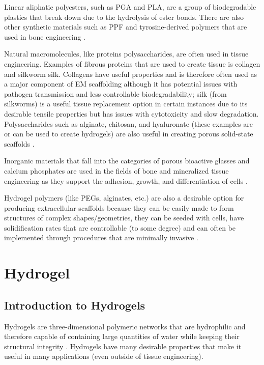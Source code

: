 Linear aliphatic polyesters, such as PGA and PLA, are a group of biodegradable plastics that break down due to the hydrolysis of ester bonds. There are also other synthetic materials such as PPF and tyrosine-derived polymers that are used in bone engineering \citep{mapx2004}.

Natural macromolecules, like proteins polysaccharides, are often used in tissue engineering. Examples of fibrous proteins that are used to create tissue is collagen and silkworm silk. Collagens have useful properties and is therefore often used as a major component of EM scaffolding although it has potential issues with pathogen transmission and less controllable biodegradability; silk (from silkworms) is a useful tissue replacement option in certain instances due to its desirable tensile properties but has issues with cytotoxicity and slow degradation. Polysaccharides such as alginate, chitosan, and hyaluronate (these examples are or can be used to create hydrogels) are also useful in creating porous solid-state scaffolds \citep{mapx2004}.

Inorganic materials that fall into the categories of porous bioactive glasses and calcium phosphates are used in the fields of bone and mineralized tissue engineering as they support the adhesion, growth, and differentiation of cells \citep{mapx2004}.

Hydrogel polymers (like PEGs, alginates, etc.) are also a desirable option for producing extracellular scaffolds because they can be easily made to form structures of complex shapes/geometries, they can be seeded with cells, have solidification rates that are controllable (to some degree) and can often be implemented through procedures that are minimally invasive \citep{mapx2004}.

\section{Hydrogel}

\subsection{Introduction to Hydrogels}
Hydrogels are three-dimensional polymeric networks that are hydrophilic and therefore capable of containing large quantities of water while keeping their structural integrity \citep{peppas_2000}. Hydrogels have many desirable properties that make it useful in many applications (even outside of tissue engineering).

